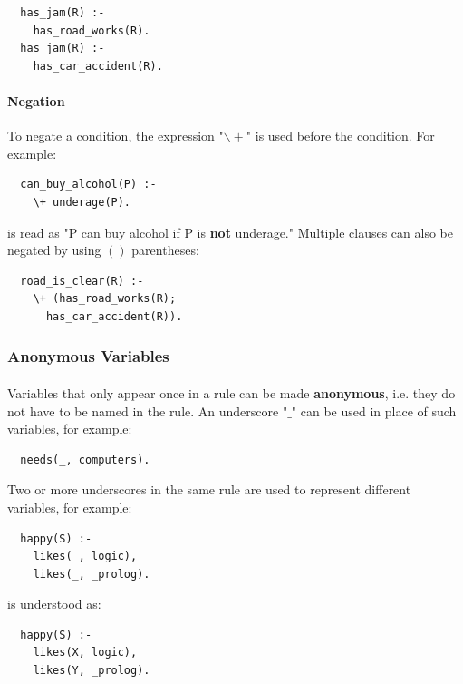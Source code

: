 \documentclass{article}
\begin{document}
\begin{multicols}{2}
  \begin{lstlisting}
  has_jam(R) :-
    has_road_works(R).
  has_jam(R) :-
    has_car_accident(R).
  \end{lstlisting}
  
  \paragraph{Negation} To negate a condition, the expression "$\backslash+$" is used before the condition. For example:
  
  \begin{lstlisting}
  can_buy_alcohol(P) :-
    \+ underage(P).
  \end{lstlisting}
  
  \noindent is read as "P can buy alcohol if P is {\bf not} underage." Multiple clauses can also be negated by using $()$ parentheses: 
  
  \begin{lstlisting}
  road_is_clear(R) :-
    \+ (has_road_works(R);
      has_car_accident(R)).
  \end{lstlisting}
  
  \subsubsection{Anonymous Variables} 
  
  \paragraph{} Variables that only appear once in a rule can be made {\bf anonymous}, i.e. they do not have to be named in the rule. An underscore "$\_$" can be used in place of such variables, for example:
  
  \begin{lstlisting}
  needs(_, computers).
  \end{lstlisting}
  
  Two or more underscores in the same rule are used to represent different variables, for example:
  
  \begin{lstlisting}
  happy(S) :-
    likes(_, logic),
    likes(_, _prolog).
  \end{lstlisting}
  
  \noindent is understood as:
  
  \begin{lstlisting}
  happy(S) :-
    likes(X, logic),
    likes(Y, _prolog).
  \end{lstlisting}
  

\end{multicols}
\end{document}
